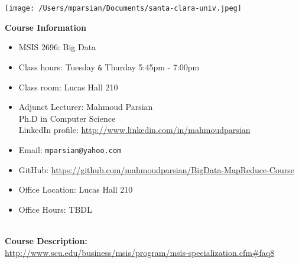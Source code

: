 \documentclass[11pt]{article}
\begin{document}
\texttt{[image: /Users/mparsian/Documents/santa-clara-univ.jpeg]} 
\bigskip
\vspace{10mm}

\textbf {\LARGE Course Information}
\begin{itemize}
	\item MSIS 2696: Big Data
	\item Class hours: Tuesday \verb#&#  Thurday 5:45pm - 7:00pm
	\item Class room: Lucas Hall 210 
	\item Adjunct Lecturer: Mahmoud Parsian \\
	Ph.D in Computer Science \\
	LinkedIn profile: \url{http://www.linkedin.com/in/mahmoudparsian}
	\item Email: \verb#mparsian@yahoo.com# 
	\item GitHub: \url{https://github.com/mahmoudparsian/BigData-MapReduce-Course} 
	\item Office Location: Lucas Hall 210 
	\item Office Hours: TBDL 
\end{itemize}

\vspace{5mm}

\textbf {\large \\ Course Description:} \\
\url{http://www.scu.edu/business/msis/program/msis-specialization.cfm#faq8}

\vspace{5mm}
\end{document}
